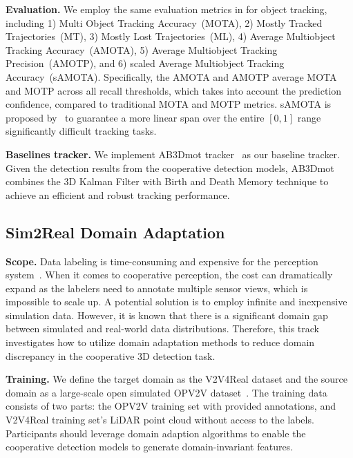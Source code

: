 \documentclass[10pt,twocolumn,letterpaper]{article}
\begin{document}
\noindent\textbf{Evaluation.} We employ the same evaluation metrics in \cite{weng20203d, caesar2020nuscenes} for object tracking, including 1) Multi Object Tracking Accuracy~(MOTA), 2) Mostly Tracked Trajectories~(MT), 3) Mostly Lost Trajectories~(ML), 4) Average Multiobject Tracking Accuracy~(AMOTA), 5) Average Multiobject Tracking Precision~(AMOTP), and 6) scaled Average Multiobject Tracking Accuracy~(sAMOTA). Specifically, the AMOTA and AMOTP average MOTA and MOTP across all recall thresholds, which takes into account the prediction confidence, compared to traditional MOTA and MOTP metrics. sAMOTA is proposed by~\cite{caesar2020nuscenes} to guarantee a more linear span over the entire $[0,1]$ range significantly difficult tracking tasks.





\noindent\textbf{Baselines tracker.} We implement AB3Dmot tracker~\cite{weng20203d} as our baseline tracker. Given the detection results from the cooperative detection models, AB3Dmot combines the 3D Kalman Filter with Birth and Death Memory technique to achieve an efficient and robust tracking performance.

\subsection{Sim2Real Domain Adaptation}
\noindent\textbf{Scope.} Data labeling is time-consuming and expensive for the perception system~\cite{xiang2022v2xp}. When it comes to cooperative perception, the cost can dramatically expand as the labelers need to annotate multiple sensor views, which is impossible to scale up. A potential solution is to employ infinite and inexpensive simulation data. However, it is known that there is a significant domain gap between simulated and real-world data distributions. Therefore, this track investigates how to utilize domain adaptation methods to reduce domain discrepancy in the cooperative 3D detection task.


\noindent\textbf{Training.} We define the target domain as the V2V4Real dataset and the source domain as a large-scale open simulated OPV2V dataset~\cite{xu2022opv2v}. The training data consists of two parts:
 the OPV2V training set with provided annotations, and V2V4Real training set's LiDAR point cloud without access to the labels. Participants should leverage domain adaption algorithms to enable the cooperative detection models to generate domain-invariant features.
\end{document}
